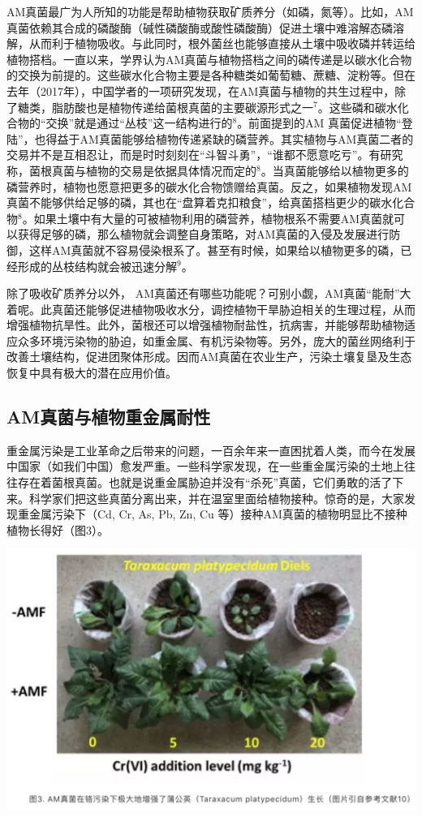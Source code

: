\documentclass[
]{book}
\begin{document}
AM真菌最广为人所知的功能是帮助植物获取矿质养分（如磷，氮等）。比如，AM真菌依赖其合成的磷酸酶（碱性磷酸酶或酸性磷酸酶）促进土壤中难溶解态磷溶解，从而利于植物吸收。与此同时，根外菌丝也能够直接从土壤中吸收磷并转运给植物搭档。一直以来，学界认为AM真菌与植物搭档之间的磷传递是以碳水化合物的交换为前提的。这些碳水化合物主要是各种糖类如葡萄糖、蔗糖、淀粉等。但在去年（2017年），中国学者的一项研究发现，在AM真菌与植物的共生过程中，除了糖类，脂肪酸也是植物传递给菌根真菌的主要碳源形式之一\(^7\)。这些磷和碳水化合物的``交换''就是通过``丛枝''这一结构进行的\(^8\)。前面提到的AM 真菌促进植物``登陆''，也得益于AM真菌能够给植物传递紧缺的磷营养。其实植物与AM真菌二者的交易并不是互相忍让，而是时时刻刻在``斗智斗勇''，``谁都不愿意吃亏''。有研究称，菌根真菌与植物的交易是依据具体情况而定的\(^8\)。当真菌能够给以植物更多的磷营养时，植物也愿意把更多的碳水化合物馈赠给真菌。反之，如果植物发现AM真菌不能够供给足够的磷，其也在``盘算着克扣粮食''，给真菌搭档更少的碳水化合物\(^8\)。如果土壤中有大量的可被植物利用的磷营养，植物根系不需要AM真菌就可以获得足够的磷，那么植物就会调整自身策略，对AM真菌的入侵及发展进行防御，这样AM真菌就不容易侵染根系了。甚至有时候，如果给以植物更多的磷，已经形成的丛枝结构就会被迅速分解\(^9\)。

除了吸收矿质养分以外， AM真菌还有哪些功能呢？可别小觑，AM真菌``能耐''大着呢。此真菌还能够促进植物吸收水分，调控植物干旱胁迫相关的生理过程，从而增强植物抗旱性。此外，菌根还可以增强植物耐盐性，抗病害，并能够帮助植物适应众多环境污染物的胁迫，如重金属、有机污染物等。另外，庞大的菌丝网络利于改善土壤结构，促进团聚体形成。因而AM真菌在农业生产，污染土壤复垦及生态恢复中具有极大的潜在应用价值。

\hypertarget{amux771fux83ccux4e0eux690dux7269ux91cdux91d1ux5c5eux8010ux6027}{%
\subsection{AM真菌与植物重金属耐性}\label{amux771fux83ccux4e0eux690dux7269ux91cdux91d1ux5c5eux8010ux6027}}

重金属污染是工业革命之后带来的问题，一百余年来一直困扰着人类，而今在发展中国家（如我们中国）愈发严重。一些科学家发现，在一些重金属污染的土地上往往存在着菌根真菌。也就是说重金属胁迫并没有``杀死''真菌，它们勇敢的活了下来。科学家们把这些真菌分离出来，并在温室里面给植物接种。惊奇的是，大家发现重金属污染下（Cd, Cr, As, Pb, Zn, Cu 等）接种AM真菌的植物明显比不接种植物长得好（图3）。

\includegraphics[width=6.67in]{images/am3}
\end{document}
